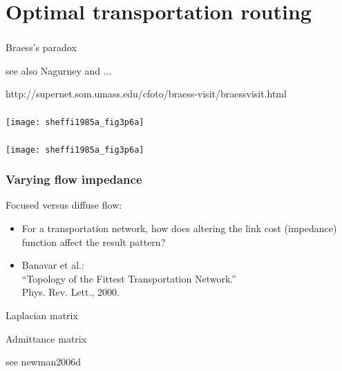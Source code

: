 \section{Optimal transportation routing}

\begin{frame}
  \frametitle{}

Braess's paradox\cite{braess1968a,braess2005a,nagurney2005a}

see also Nagurney and ...

http://supernet.som.umass.edu/cfoto/braess-visit/braessvisit.html


\end{frame}


\begin{frame}
  \frametitle{}

  \texttt{[image: sheffi1985a\_fig3p6a]}

  \cite{sheffi1985a}
\end{frame}

\begin{frame}
  \frametitle{}

  \texttt{[image: sheffi1985a\_fig3p6a]}

  \cite{sheffi1985a}
\end{frame}


\begin{frame}
  \frametitle{}


\end{frame}


\begin{frame}
  \frametitle{Varying flow impedance}

  \begin{block}{Focused versus diffuse flow:}
    \begin{itemize}
    \item<1->
      For a transportation network, how does
      altering the link cost (impedance) function
      affect the result pattern?
    \item<2->
      Banavar et al.\cite{banavar2000a}:\\
      ``Topology of the Fittest Transportation Network.''\\
      Phys. Rev. Lett., 2000.
    \end{itemize}
    
  \end{block}

  
\end{frame}


\begin{frame}
  
  Laplacian matrix

  Admittance matrix

  see newman2006d

  
\end{frame}